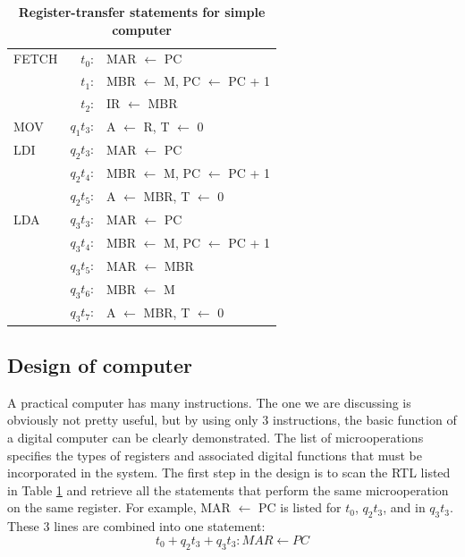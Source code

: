 \documentclass{book}
\begin{document}
\begin{table}[h,c]

\begin{center}
 \begin{tabular}{l r l}
 	\hline
 	FETCH & $t_0$: & MAR $\leftarrow$ PC \\
		  & $t_1$: & MBR $\leftarrow$ M, PC $\leftarrow$ PC + 1 \\
		  & $t_2$: & IR $\leftarrow$ MBR \\
	\hline
	MOV & $q_1t_3$: & A $\leftarrow$ R, T $\leftarrow$ 0 \\
	\hline
	LDI	& $q_2t_3$: & MAR $\leftarrow$ PC\\
		& $q_2t_4$: & MBR $\leftarrow$ M, PC $\leftarrow$ PC + 1 \\
		& $q_2t_5$: & A $\leftarrow$ MBR, T $\leftarrow$ 0\\
	\hline
	LDA & $q_3t_3$: & MAR $\leftarrow$ PC \\
		& $q_3t_4$: & MBR $\leftarrow$ M, PC $\leftarrow$ PC + 1 \\
		& $q_3t_5$: & MAR $\leftarrow$ MBR \\
		& $q_3t_6$: & MBR $\leftarrow$ M \\
		& $q_3t_7$: & A $\leftarrow$ MBR, T $\leftarrow$ 0\\
	\hline
  \end{tabular}
  \caption{\textbf{Register-transfer statements for simple computer}}
  \label{rtl_simple}
 \end{center}
\end{table}

\subsection{Design of computer}

A practical computer has many instructions. The one we are discussing is obviously not pretty useful, but by using only 3 instructions, the basic function of a digital computer can be clearly demonstrated. The list of microoperations specifies the types of registers and associated digital functions that must be incorporated in the system. The first step in the design is to scan the RTL listed in Table \ref{rtl_simple} and retrieve all the statements that perform the same microoperation on the same register. For example, MAR $\leftarrow$ PC is listed for $t_0$, $q_2t_3$, and in $q_3t_3$. These 3 lines are combined into one statement: $$t_0 + q_2t_3 + q_3t_3: MAR \leftarrow PC$$
\end{document}

